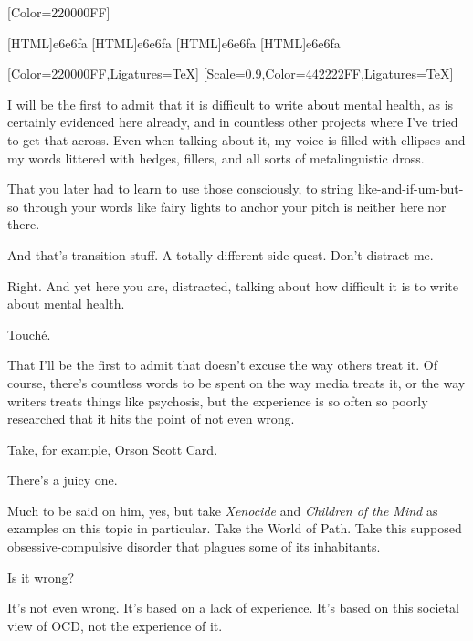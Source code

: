 \renewfontfamily{}[Color=220000FF]

[HTML]{e6e6fa}
[HTML]{e6e6fa}
[HTML]{e6e6fa}
[HTML]{e6e6fa}
\begin{paracol}{2}
\begin{leftcolumn}

[Color=220000FF,Ligatures=TeX]
\renewfontfamily{}[Scale=0.9,Color=442222FF,Ligatures=TeX]

\noindent I will be the first to admit that it is difficult to write about mental health, as is certainly evidenced here already, and in countless other projects where I've tried to get that across. Even when talking about it, my voice is filled with ellipses and my words littered with hedges, fillers, and all sorts of metalinguistic dross.

\begin{ally}
That you later had to learn to use those consciously, to string like-and-if-um-but-so through your words like fairy lights to anchor your pitch is neither here nor there.
\end{ally}
And that's transition stuff. A totally different side-quest. Don't distract me.

\begin{ally}
Right. And yet here you are, distracted, talking about how difficult it is to write about mental health.
\end{ally}
Touché.

That I'll be the first to admit that doesn't excuse the way others treat it. Of course, there's countless words to be spent on the way media treats it, or the way writers treats things like psychosis, but the experience is so often so poorly researched that it hits the point of not even wrong.

Take, for example, Orson Scott Card.

\begin{ally}
There's a juicy one.
\end{ally}
Much to be said on him, yes, but take \emph{Xenocide} and \emph{Children of the Mind} as examples on this topic in particular. Take the World of Path. Take this supposed obsessive-compulsive disorder that plagues some of its inhabitants.

\begin{ally}
Is it wrong?
\end{ally}
It's not even wrong. It's based on a lack of experience. It's based on this societal view of OCD, not the experience of it.


\end{leftcolumn}
\end{paracol}
